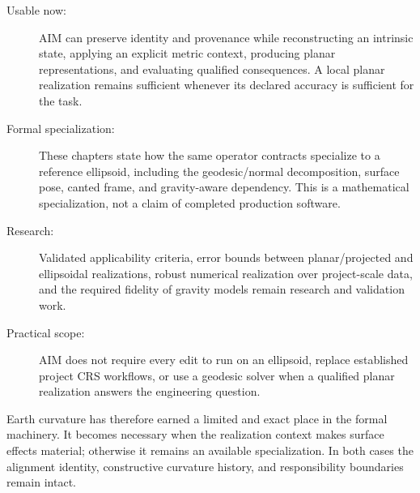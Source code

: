\begin{description}
\item[Usable now:] AIM can preserve identity and provenance while
  reconstructing an intrinsic state, applying an explicit metric
  context, producing planar representations, and evaluating qualified
  consequences. A local planar realization remains sufficient whenever
  its declared accuracy is sufficient for the task.
\item[Formal specialization:] These chapters state how the same operator
  contracts specialize to a reference ellipsoid, including the
  geodesic/normal decomposition, surface pose, canted frame, and
  gravity-aware dependency. This is a mathematical specialization, not
  a claim of completed production software.
\item[Research:] Validated applicability criteria, error bounds
  between planar/projected and ellipsoidal realizations, robust numerical
  realization over project-scale data, and the required fidelity of
  gravity models remain research and validation work.
\item[Practical scope:] AIM does not require every edit to
  run on an ellipsoid, replace established project CRS workflows, or use
  a geodesic solver when a qualified planar realization answers the
  engineering question.
\end{description}

Earth curvature has therefore earned a limited and exact place in the
formal machinery. It becomes necessary when the realization context
makes surface effects material; otherwise it remains an available
specialization. In both cases the alignment identity, constructive
curvature history, and responsibility boundaries remain intact.
